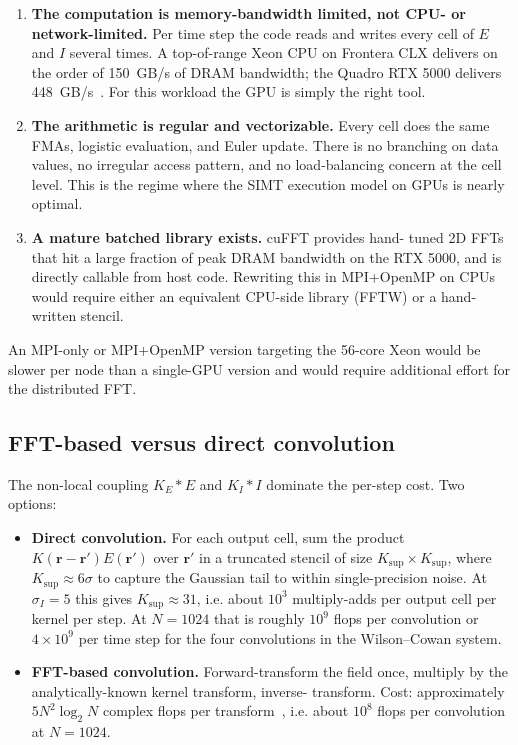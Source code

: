 \documentclass[11pt]{article}
\begin{document}
\begin{enumerate}

  \item \textbf{The computation is memory-bandwidth limited, not CPU-
  or network-limited.} Per time step the code reads and writes every
  cell of $E$ and $I$ several times. A top-of-range Xeon CPU on
  Frontera CLX delivers on the order of \SI{150}{GB/s} of DRAM
  bandwidth; the Quadro RTX 5000 delivers
  \SI{448}{GB/s}~\cite{quadrortx5000}. For this workload the GPU is
  simply the right tool.

  \item \textbf{The arithmetic is regular and vectorizable.} Every cell
  does the same FMAs, logistic evaluation, and Euler update. There is
  no branching on data values, no irregular access pattern, and no
  load-balancing concern at the cell level. This is the regime where
  the SIMT execution model on GPUs is nearly optimal.

  \item \textbf{A mature batched library exists.} cuFFT provides hand-
  tuned 2D FFTs that hit a large fraction of peak DRAM bandwidth on
  the RTX 5000, and is directly callable from host code. Rewriting
  this in MPI+OpenMP on CPUs would require either an equivalent
  CPU-side library (FFTW) or a hand-written stencil.
\end{enumerate}

An MPI-only or MPI+OpenMP version targeting the 56-core Xeon would be
slower per node than a single-GPU version and would require additional
effort for the distributed FFT.

\subsection{FFT-based versus direct convolution}

The non-local coupling $K_{E}\!*\!E$ and $K_{I}\!*\!I$ dominate the
per-step cost. Two options:

\begin{itemize}
  \item \textbf{Direct convolution.} For each output cell, sum the
  product $K(\mathbf{r}-\mathbf{r}') E(\mathbf{r}')$ over
  $\mathbf{r}'$ in a truncated stencil of size $K_{\mathrm{sup}}
  \times K_{\mathrm{sup}}$, where $K_{\mathrm{sup}} \!\approx\! 6\sigma$
  to capture the Gaussian tail to within single-precision noise. At
  $\sigma_{I} = 5$ this gives $K_{\mathrm{sup}} \!\approx\! 31$, i.e.
  about $10^{3}$ multiply-adds per output cell per kernel per step.
  At $N = 1024$ that is roughly $10^{9}$ flops per convolution or
  $4 \times 10^{9}$ per time step for the four convolutions in the
  Wilson--Cowan system.

  \item \textbf{FFT-based convolution.} Forward-transform the field
  once, multiply by the analytically-known kernel transform, inverse-
  transform. Cost: approximately $5 N^{2} \log_{2} N$ complex flops
  per transform~\cite{cooley1965}, i.e. about $10^{8}$ flops per
  convolution at $N = 1024$.
\end{itemize}
\end{document}
